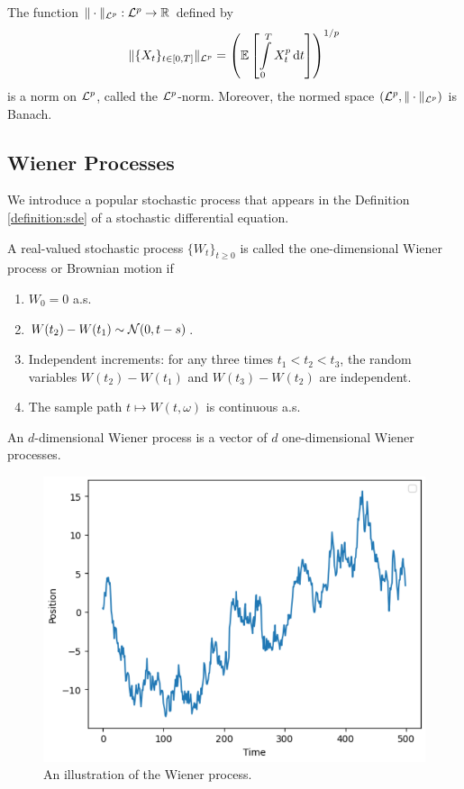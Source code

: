 \begin{theorem}
 The function $\|\cdot\|_{\mathcal{L}^p}:\mathcal{L}^p\to\mathbb{R}$ defined by
 \begin{equation}
  \|\{X_t\}_{t\in [0,T]}\|_{\mathcal{L}^p} = \left(\mathbb{E}\left[\int\limits_0^T X^p_t \,\mathrm{d} t\right]\right)^{1/p}
 \end{equation}
 is a norm on $\mathcal{L}^p$, called the $\mathcal{L}^p$-norm. Moreover, the normed space $(\mathcal{L}^p, \|\cdot\|_{\mathcal{L}^p})$ is Banach.
\end{theorem}



\subsection{Wiener Processes}

We introduce a popular stochastic process that appears in the Definition \ref{definition:sde} of a stochastic differential equation.

\begin{definition}
 \label{definition:wiener-process}
 A real-valued stochastic process $\{W_t\}_{t\ge0}$ is called the one-dimensional Wiener process or Brownian motion if
 \begin{enumerate}
  \item $W_0=0$ a.s.
  \item $W(t_2)-W(t_1) \sim \mathcal{N}(0,t-s)$.
  \item Independent increments: for any three times $t_1<t_2<t_3$, the random variables $W(t_2)-W(t_1)$ and $W(t_3)-W(t_2)$ are independent.
  \item The sample path $t\mapsto W(t,\omega)$  is continuous a.s.
 \end{enumerate}
 An $d$-dimensional Wiener process is a vector of $d$ one-dimensional Wiener processes.
\end{definition}

\begin{figure}
 \centering
 \includegraphics[width=0.5\linewidth]{img/1d-brownian.png}
 \vspace{0.5cm}
 \caption{An illustration of the Wiener process.}
 \label{figure:brownian-motion-illustration}
\end{figure}

